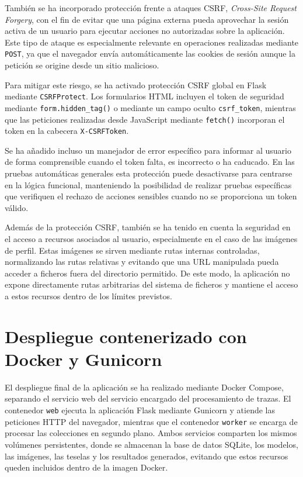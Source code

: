 También se ha incorporado protección frente a ataques CSRF, \textit{Cross-Site Request Forgery}, con el fin de evitar que una página externa pueda aprovechar la sesión activa de un usuario para ejecutar acciones no autorizadas sobre la aplicación. Este tipo de ataque es especialmente relevante en operaciones realizadas mediante \texttt{POST}, ya que el navegador envía automáticamente las cookies de sesión aunque la petición se origine desde un sitio malicioso.

Para mitigar este riesgo, se ha activado protección CSRF global en Flask mediante \texttt{CSRFProtect}. Los formularios HTML incluyen el token de seguridad mediante \texttt{form.hidden\_tag()} o mediante un campo oculto \texttt{csrf\_token}, mientras que las peticiones realizadas desde JavaScript mediante \texttt{fetch()} incorporan el token en la cabecera \texttt{X-CSRFToken}.

Se ha añadido incluso un manejador de error específico para informar al usuario de forma comprensible cuando el token falta, es incorrecto o ha caducado. En las pruebas automáticas generales esta protección puede desactivarse para centrarse en la lógica funcional, manteniendo la posibilidad de realizar pruebas específicas que verifiquen el rechazo de acciones sensibles cuando no se proporciona un token válido.

Además de la protección CSRF, también se ha tenido en cuenta la seguridad en el acceso a recursos asociados al usuario, especialmente en el caso de las imágenes de perfil. Estas imágenes se sirven mediante rutas internas controladas, normalizando las rutas relativas y evitando que una URL manipulada pueda acceder a ficheros fuera del directorio permitido. De este modo, la aplicación no expone directamente rutas arbitrarias del sistema de ficheros y mantiene el acceso a estos recursos dentro de los límites previstos.

\section{Despliegue contenerizado con Docker y Gunicorn}

El despliegue final de la aplicación se ha realizado mediante Docker Compose, separando el servicio web del servicio encargado del procesamiento de trazas. El contenedor \texttt{web} ejecuta la aplicación Flask mediante Gunicorn y atiende las peticiones HTTP del navegador, mientras que el contenedor \texttt{worker} se encarga de procesar las colecciones en segundo plano. Ambos servicios comparten los mismos volúmenes persistentes, donde se almacenan la base de datos SQLite, los modelos, las imágenes, las teselas y los resultados generados, evitando que estos recursos queden incluidos dentro de la imagen Docker.

